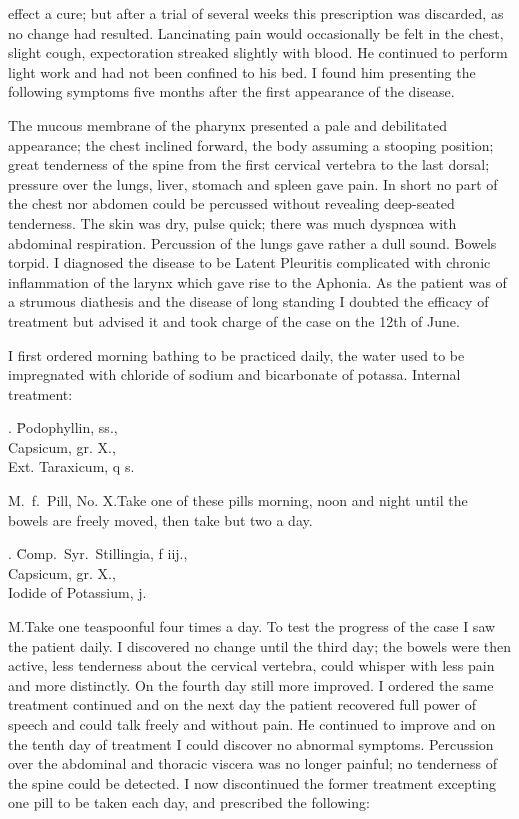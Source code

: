 effect a cure; but after a trial of several weeks this prescription was
discarded, as no change had resulted. Lancinating pain would occasionally
be felt in the chest, slight cough, expectoration streaked slightly
with blood. He continued to perform light work and had not been
confined to his bed. I found him presenting the following symptoms
five months after the first appearance of the disease.

The mucous membrane of the pharynx presented a pale and debilitated
appearance; the chest inclined forward, the body assuming a
stooping position; great tenderness of the spine from the first cervical
vertebra to the last dorsal; pressure over the lungs, liver, stomach
and spleen gave pain. In short no part of the chest nor abdomen
could be percussed without revealing deep-seated tenderness. The
skin was dry, pulse quick; there was much dyspnœa with abdominal
respiration. Percussion of the lungs gave rather a dull sound. Bowels
torpid. I diagnosed the disease to be Latent Pleuritis complicated
with chronic inflammation of the larynx which gave rise to the Aphonia.
As the patient was of a strumous diathesis and the disease of long standing
I doubted the efficacy of treatment but advised it and took charge
of the case on the 12th of June.

I first ordered morning bathing to be practiced daily, the water used
to be impregnated with chloride of sodium and bicarbonate of potassa.
Internal treatment:

\begin{center}
\begin{tabbing}
  \prescription. \= Podophyllin, \dram{}ss., \\
    \> Capsicum, gr. X., \\
    \> Ext. Taraxicum, q s.
\end{tabbing}
\end{center}
M.\ f.\ Pill, No. X.\quad{}Take one of these pills morning, noon and night
until the bowels are freely moved, then take but two a day.
\begin{center}
\begin{tabbing}
  \prescription. \= Comp.\ Syr.\ Stillingia, f\ounce{} iij., \\
    \> Capsicum, gr. X., \\
    \> Iodide of Potassium, \ounce{} j.
\end{tabbing}
\end{center}
M.\quad{}Take one teaspoonful four times a day. To test the progress of
the case I saw the patient daily. I discovered no change until the third
day; the bowels were then active, less tenderness about the cervical
vertebra, could whisper with less pain and more distinctly. On the
fourth day still more improved. I ordered the same treatment continued
and on the next day the patient recovered full power of speech and could
talk freely and without pain. He continued to improve and on the tenth
day of treatment I could discover no abnormal symptoms. Percussion
over the abdominal and thoracic viscera was no longer painful; no tenderness
of the spine could be detected. I now discontinued the former
treatment excepting one pill to be taken each day, and prescribed the
following:\endinput
